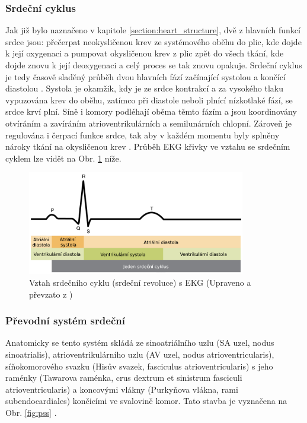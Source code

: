\subsubsection{Srdeční cyklus}
\label{section:cardiac_cycle}
Jak již bylo naznačeno v kapitole \ref{section:heart_structure}, dvě z hlavních
funkcí srdce jsou: přečerpat neokysličenou krev ze systémového oběhu do plic,
kde dojde k její oxygenaci a pumpovat okysličenou krev z plic zpět do všech
tkání, kde dojde znovu k její deoxygenaci a celý proces se tak znovu opakuje.
Srdeční cyklus je tedy časově sladěný průběh dvou hlavních fází začínající
systolou a končící diastolou \cite{Weinhaus2005}. Systola je okamžik, kdy je ze
srdce kontrakcí a za vysokého tlaku vypuzována krev do oběhu, zatímco při
diastole neboli plnící nízkotlaké fází, se srdce krví plní. Síně i komory
podléhají oběma těmto fázím a jsou koordinovány otvíráním a zavíráním
atrioventrikulárních a semilunárních chlopní. Zároveň je regulována i čerpací
funkce srdce, tak aby v každém momentu byly splněny nároky tkání na okysličenou
krev \cite{OpenStax}. Průběh EKG křivky ve vztahu se srdečním cyklem lze vidět
na Obr. \ref{fig:cardiac_cycle_ecg} níže.

\begin{figure}[h]
	\begin{center}
		\includegraphics[width=0.85\textwidth]{../assets/anatomy/cardiac_cycle_ecg}
		\caption{Vztah srdečního cyklu (srdeční revoluce) s EKG (Upraveno a
		převzato z \cite{OpenStax})}
		\label{fig:cardiac_cycle_ecg}
	\end{center}
\end{figure}

\subsubsection{Převodní systém srdeční}
\label{section:pss}
Anatomicky se tento systém skládá ze sinoatriálního uzlu (SA uzel, nodus
sinoatrialis), atrioventrikulárního uzlu (AV uzel, nodus atrioventricularis),
síňokomorového svazku (Hisův svazek, fasciculus atrioventricularis) s jeho
raménky (Tawarova raménka, crus dextrum et sinistrum fasciculi
atrioventricularis) a koncovými vlákny (Purkyňova vlákna, rami subendocardiales)
končicími ve svalovině komor. Tato stavba je vyznačena na Obr. \ref{fig:pss}
\cite{Dylevsky2013}.

